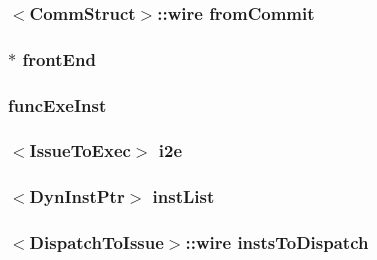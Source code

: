\label{classBackEnd_aa40219506ff80e4e8c5a9a3b1205b282}
\hypertarget{classBackEnd_a77bf6c956edddf1d551d5371ff72162e}{
\subsubsection[{fromCommit}]{$<${\bf CommStruct}$>$::wire {\bf fromCommit}}}
\label{classBackEnd_a77bf6c956edddf1d551d5371ff72162e}
\hypertarget{classBackEnd_a67c762418bb2017cb2dce5a0c94f0788}{
\subsubsection[{frontEnd}]{$\ast$ {\bf frontEnd}}}
\label{classBackEnd_a67c762418bb2017cb2dce5a0c94f0788}
\hypertarget{classBackEnd_a344acde4f72898017365be79fd18a323}{
\subsubsection[{funcExeInst}]{ {\bf funcExeInst}}}
\label{classBackEnd_a344acde4f72898017365be79fd18a323}
\hypertarget{classBackEnd_a055203b013ada25d70a2a2c8b2364455}{
\subsubsection[{i2e}]{$<${\bf IssueToExec}$>$ {\bf i2e}}}
\label{classBackEnd_a055203b013ada25d70a2a2c8b2364455}
\hypertarget{classBackEnd_ae10a391d02ce1ef67ee13cd82b7d46e5}{
\subsubsection[{instList}]{$<${\bf DynInstPtr}$>$ {\bf instList}}}
\label{classBackEnd_ae10a391d02ce1ef67ee13cd82b7d46e5}
\hypertarget{classBackEnd_ace1cd34be1eca99cb8c1d3a30e32fcbe}{
\subsubsection[{instsToDispatch}]{$<${\bf DispatchToIssue}$>$::wire {\bf instsToDispatch}}}
